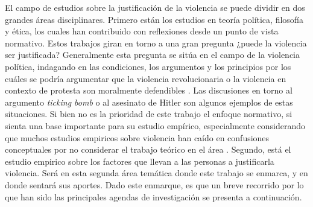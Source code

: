\documentclass[12pt,twoside]{templates/facsothesis}
\begin{document}
El campo de estudios sobre la justificación de la violencia se puede dividir en dos grandes áreas disciplinares. Primero están los estudios en teoría política, filosofía y ética, los cuales han contribuido con reflexiones desde un punto de vista normativo. Estos trabajos giran en torno a una gran pregunta ¿puede la violencia ser justificada? Generalmente esta pregunta se sitúa en el campo de la violencia política, indagando en las condiciones, los argumentos y los principios por los cuáles se podría argumentar que la violencia revolucionaria o la violencia en contexto de protesta son moralmente defendibles \citep{Demirbas2019, Frazer2019, Gerd1969, Hills2011, Keane2004, Magil2008, Nielsen1981, Wells1970}. Las discusiones en torno al argumento \emph{ticking bomb} \citep[ver][]{APT2007, Bufacchi2006} o al asesinato de Hitler \citep[ver][]{Dean2005, Frazer2019} son algunos ejemplos de estas situaciones. Si bien no es la prioridad de este trabajo el enfoque normativo, si sienta una base importante para su estudio empírico, especialmente considerando que muchos estudios empiricos sobre violencia han caído en confusiones conceptuales por no considerar el trabajo teórico en el área \citep{Bufacchi2007}. Segundo, está el estudio empirico sobre los factores que llevan a las personas a justificarla violencia. Será en esta segunda área temática donde este trabajo se enmarca, y en donde sentará sus aportes. Dado este enmarque, es que un breve recorrido por lo que han sido las principales agendas de investigación se presenta a continuación.
\end{document}
